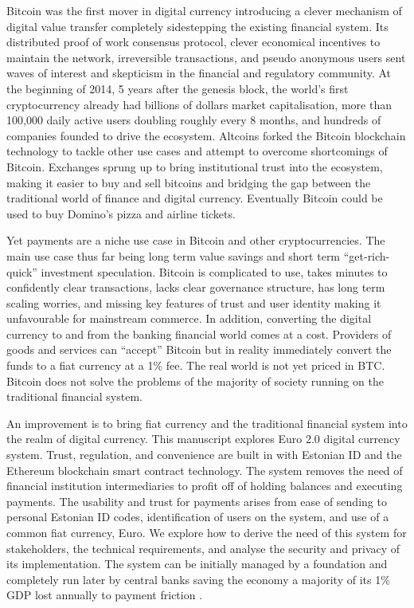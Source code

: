 \documentclass[12pt]{article} %
\begin{document}
Bitcoin was the first mover in digital currency introducing a clever mechanism of digital value transfer completely sidestepping the existing financial system\cite{nakamoto2008bitcoin}. Its distributed proof of work consensus protocol, clever economical incentives to maintain the network, irreversible transactions, and pseudo anonymous users sent waves of interest and skepticism in the financial and regulatory community. At the beginning of 2014, 5 years after the genesis block, the world's first cryptocurrency already had billions of dollars market capitalisation\cite{coinmarketcap2017bitcoin}, more than 100,000 daily active users doubling roughly every 8 months\cite{RePEc:fip:fedgfe:2014-104}, and hundreds of companies founded to drive the ecosystem. Altcoins forked the Bitcoin blockchain technology to tackle other use cases and attempt to overcome shortcomings of Bitcoin. Exchanges sprung up to bring institutional trust into the ecosystem, making it easier to buy and sell bitcoins and bridging the gap between the traditional world of finance and digital currency. Eventually Bitcoin could be used to buy Domino's pizza and airline tickets.

Yet payments are a niche use case in Bitcoin and other cryptocurrencies\cite{sas2016design}. The main use case thus far being long term value savings and short term ``get-rich-quick'' investment speculation. Bitcoin is complicated to use, takes minutes to confidently clear transactions, lacks clear governance structure, has long term scaling worries, and missing key features of trust and user identity making it unfavourable for mainstream commerce. In addition, converting the digital currency to and from the banking financial world comes at a cost. Providers of goods and services can ``accept'' Bitcoin but in reality immediately convert the funds to a fiat currency at a 1\% fee. The real world is not yet priced in BTC. Bitcoin does not solve the problems of the majority of society running on the traditional financial system.

An improvement is to bring fiat currency and the traditional financial system into the realm of digital currency. This manuscript explores Euro 2.0 digital currency system. Trust, regulation, and convenience are built in with Estonian ID and the Ethereum blockchain smart contract technology. The system removes the need of financial institution intermediaries to profit off of holding balances and executing payments. The usability and trust for payments arises from ease of sending to personal Estonian ID codes, identification of users on the system, and use of a common fiat currency, Euro. We explore how to derive the need of this system for stakeholders, the technical requirements, and analyse the security and privacy of its implementation. The system can be initially managed by a foundation and completely run later by central banks saving the economy a majority of its 1\% GDP lost annually to payment friction \cite{kaarmann2013cost}.
\end{document}
